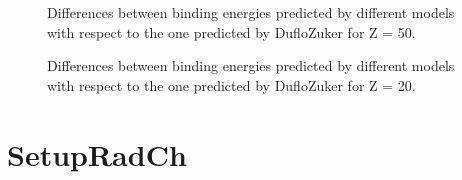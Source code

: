 \documentclass[letterpaper,10pt,english]{sphinxmanual}
\begin{document}
\begin{figure}[htbp]
\centering
\capstart

\noindent{}
\caption{Differences between binding energies predicted by different models with respect to the one predicted by Duflo\sphinxhyphen{}Zuker for Z = 50.}\label{\detokenize{source/api/setup_masses_theory:id1}}\end{figure}

\begin{figure}[htbp]
\centering
\capstart

\noindent{}
\caption{Differences between binding energies predicted by different models with respect to the one predicted by Duflo\sphinxhyphen{}Zuker for Z = 20.}\label{\detokenize{source/api/setup_masses_theory:id2}}\end{figure}

\sphinxstepscope


\section{SetupRadCh}
\label{\detokenize{source/api/setup_rad_ch:setupradch}}\label{\detokenize{source/api/setup_rad_ch::doc}}\label{\detokenize{source/api/setup_rad_ch:module-nucleardatapy.setup_rad_ch}}
\end{document}
